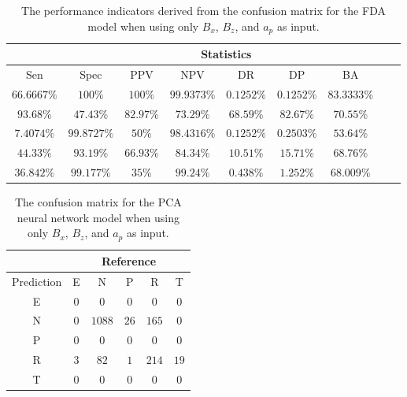 \begin{table}[!ht]
	\centering
	\begin{tabular}{|c|c|c|c|c|c|c|c|c|}
		\hline
		 & \multicolumn{7}{c|}{Statistics} \\ \hline
		Sen & Spec & PPV & NPV & DR & DP & BA \\ \hline
		$66.6667\%$ & $100\%$ & $100\%$ & $99.9373\%$ & $0.1252\%$ & $0.1252\%$ & $83.3333\%$ \\ \hline
		$93.68\%$ & $47.43\%$ & $82.97\%$ & $73.29\%$ & $68.59\%$ & $82.67\%$ & $70.55\%$ \\ \hline
		$7.4074\%$ & $99.8727\%$ & $50\%$ & $98.4316\%$ & $0.1252\%$ & $0.2503\%$ & $53.64\%$ \\ \hline
		$44.33\%$ & $93.19\%$ & $66.93\%$ & $84.34\%$ & $10.51\%$ & $15.71\%$ & $68.76\%$ \\ \hline
		$36.842\%$ & $99.177\%$ & $35\%$ & $99.24\%$ & $0.438\%$ & $1.252\%$ & $68.009\%$ \\ \hline
	\end{tabular}
	\caption{The performance indicators derived from the confusion matrix for the FDA model when using only $B_{x}$, $B_{z}$, and $a_{p}$ as input.}
	\label{tab:cs:xzap:fda}
\end{table}

\begin{table}[!ht]
	\centering
	\begin{tabular}{|c|c|c|c|c|c|}
		\hline
		 & \multicolumn{5}{|c|}{Reference} \\ \hline
		 Prediction & E & N & P & R & T \\ \hline
		 E & $0$ & $0$ & $0$ & $0$ & $0$ \\ \hline
		 N & $0$ & $1088$ & $26$ & $165$ & $0$ \\ \hline
		 P & $0$ & $0$ & $0$ & $0$ & $0$ \\ \hline
		 R & $3$ & $82$ & $1$ & $214$ & $19$ \\ \hline
		 T & $0$ & $0$ & $0$ & $0$ & $0$ \\ \hline
	\end{tabular}
	\caption{The confusion matrix for the PCA neural network model when using only $B_{x}$, $B_{z}$, and $a_{p}$ as input.}
	\label{tab:cm:xzap:pcaNNet}
\end{table}


